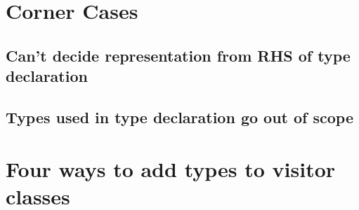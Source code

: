 \documentclass[acmsmall,review,anonymous]{acmart}\settopmatter{printfolios=true,printccs=false,printacmref=false}
\begin{document}
\section{Corner Cases}
\label{chap:pitfalls}

\subsection{Can't decide representation from RHS of type declaration}

\subsection{Types used in type declaration go out of scope}

\section{Four ways to add types to visitor classes}
\end{document}
